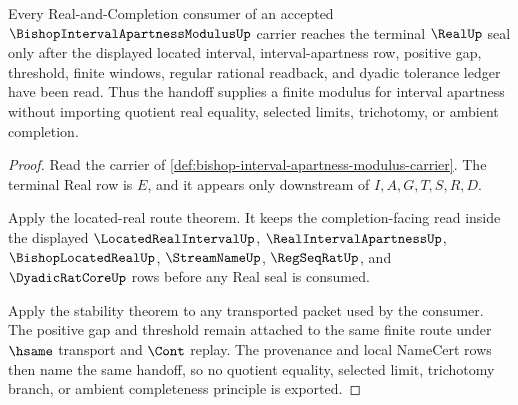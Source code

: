 \begin{theorem}
\label{thm:bishop-interval-apartness-modulus-real-completion-handoff}
Every Real-and-Completion consumer of an accepted $\BishopIntervalApartnessModulusUp$ carrier reaches the terminal $\RealUp$ seal only after the displayed located interval, interval-apartness row, positive gap, threshold, finite windows, regular rational readback, and dyadic tolerance ledger have been read. Thus the handoff supplies a finite modulus for interval apartness without importing quotient real equality, selected limits, trichotomy, or ambient completion.
\end{theorem}
\begin{proof}
Read the carrier of \autoref{def:bishop-interval-apartness-modulus-carrier}. The terminal Real row is $E$, and it appears only downstream of $I,A,G,T,S,R,D$.

Apply the located-real route theorem. It keeps the completion-facing read inside the displayed $\LocatedRealIntervalUp$, $\RealIntervalApartnessUp$, $\BishopLocatedRealUp$, $\StreamNameUp$, $\RegSeqRatUp$, and $\DyadicRatCoreUp$ rows before any Real seal is consumed.

Apply the stability theorem to any transported packet used by the consumer. The positive gap and threshold remain attached to the same finite route under $\hsame$ transport and $\Cont$ replay. The provenance and local NameCert rows then name the same handoff, so no quotient equality, selected limit, trichotomy branch, or ambient completeness principle is exported.
\end{proof}


